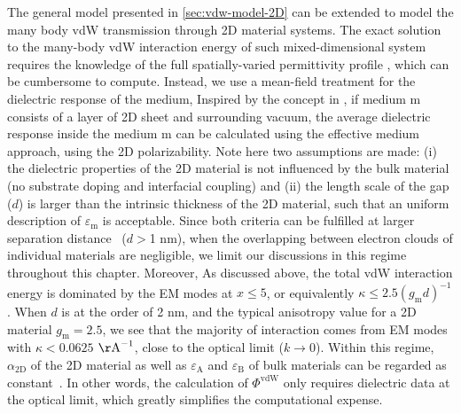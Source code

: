 The general model presented in \autoref{sec:vdw-model-2D} can be
extended to model the many body vdW transmission through 2D material
systems.
%
The exact solution to the many-body vdW interaction energy of such
mixed-dimensional system requires the knowledge of the full
spatially-varied permittivity profile \cite{Podgornik_2004_continuum},
which can be cumbersome to compute.
%
Instead, we use a mean-field treatment for
the dielectric response of the medium, Inspired by the concept in
, if medium m consists of a layer of
2D sheet and surrounding vacuum, the average dielectric response
inside the medium m can be calculated using the effective medium
approach, using the 2D polarizability. 
%
Note here two assumptions are made: (i) the dielectric properties of
the 2D material is not influenced by the bulk material (\ie no
substrate doping and interfacial coupling) and (ii) the length scale
of the gap ($d$) is larger than the intrinsic thickness of the 2D
material, such that an uniform description of $\varepsilon_{\mathrm{m}}$ is acceptable.
%
Since both criteria can be fulfilled at larger separation
distance~\cite{Dobson_2012_rev} (\eg $d>$1 nm), when the overlapping
between electron clouds of individual materials are negligible, we
limit our discussions in this regime throughout this chapter.
%
Moreover, As discussed above, the total vdW interaction energy is dominated by
the EM modes at $x \leq 5$, or equivalently
\(\kappa \leq 2.5 (g_{\mathrm{m}} d)^{-1}\).
%
When $d$ is at the order of 2 nm, and the typical anisotropy value for
a 2D material $g_{\mathrm{m}}=2.5$, we see that the majority of interaction comes
from EM modes with \(\kappa<0.0625\) \(\mathrm{\AA{}}^{-1}\), close to the optical limit ($k\to0$).
%
Within this regime, $\alpha_{\mathrm{2D}}$ of the 2D material as well
as $\varepsilon_{\mathrm{A}}$ and $\varepsilon_{\mathrm{B}}$ of bulk
materials can be regarded as
constant~\cite{Li_2005_diele}.
%
In other words, the calculation of $\Phi^{\mathrm{vdW}}$ only requires
dielectric data at the optical limit, which greatly simplifies the
computational expense.

